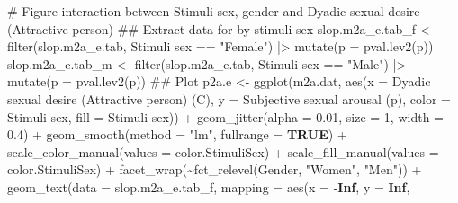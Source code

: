 \documentclass[
  bookmarksnumbered]{article}
\newenvironment{Shaded}{\begin{snugshade}}{\end{snugshade}}
\newcommand{\AttributeTok}[1]{\textcolor[rgb]{0.80,0.80,0.80}{#1}}
\newcommand{\CommentTok}[1]{\textcolor[rgb]{0.50,0.62,0.50}{#1}}
\newcommand{\ConstantTok}[1]{\textcolor[rgb]{0.86,0.64,0.64}{\textbf{#1}}}
\newcommand{\DecValTok}[1]{\textcolor[rgb]{0.86,0.86,0.80}{#1}}
\newcommand{\DocumentationTok}[1]{\textcolor[rgb]{0.50,0.62,0.50}{#1}}
\newcommand{\FloatTok}[1]{\textcolor[rgb]{0.75,0.75,0.82}{#1}}
\newcommand{\FunctionTok}[1]{\textcolor[rgb]{0.94,0.94,0.56}{#1}}
\newcommand{\NormalTok}[1]{\textcolor[rgb]{0.80,0.80,0.80}{#1}}
\newcommand{\OtherTok}[1]{\textcolor[rgb]{0.94,0.94,0.56}{#1}}
\newcommand{\SpecialCharTok}[1]{\textcolor[rgb]{0.86,0.64,0.64}{#1}}
\newcommand{\StringTok}[1]{\textcolor[rgb]{0.80,0.58,0.58}{#1}}
\begin{document}
\begin{Shaded}
\begin{Highlighting}[]
\CommentTok{\# Figure interaction between Stimuli sex, gender and Dyadic sexual desire (Attractive person)}
\DocumentationTok{\#\# Extract data for by stimuli sex}
\NormalTok{slop.m2a\_e.tab\_f }\OtherTok{\textless{}{-}} \FunctionTok{filter}\NormalTok{(slop.m2a\_e.tab, }\StringTok{\textasciigrave{}}\AttributeTok{Stimuli sex}\StringTok{\textasciigrave{}} \SpecialCharTok{==} \StringTok{"Female"}\NormalTok{) }\SpecialCharTok{|\textgreater{}}
  \FunctionTok{mutate}\NormalTok{(}\AttributeTok{p =} \FunctionTok{pval.lev2}\NormalTok{(p))}
\NormalTok{slop.m2a\_e.tab\_m }\OtherTok{\textless{}{-}} \FunctionTok{filter}\NormalTok{(slop.m2a\_e.tab, }\StringTok{\textasciigrave{}}\AttributeTok{Stimuli sex}\StringTok{\textasciigrave{}} \SpecialCharTok{==} \StringTok{"Male"}\NormalTok{) }\SpecialCharTok{|\textgreater{}}
  \FunctionTok{mutate}\NormalTok{(}\AttributeTok{p =} \FunctionTok{pval.lev2}\NormalTok{(p))}
\DocumentationTok{\#\# Plot}
\NormalTok{p2a.e }\OtherTok{\textless{}{-}} \FunctionTok{ggplot}\NormalTok{(m2a.dat, }\FunctionTok{aes}\NormalTok{(}\AttributeTok{x =} \StringTok{\textasciigrave{}}\AttributeTok{Dyadic sexual desire (Attractive person) (C)}\StringTok{\textasciigrave{}}\NormalTok{,}
                             \AttributeTok{y =} \StringTok{\textasciigrave{}}\AttributeTok{Subjective sexual arousal (p)}\StringTok{\textasciigrave{}}\NormalTok{,}
                             \AttributeTok{color =} \StringTok{\textasciigrave{}}\AttributeTok{Stimuli sex}\StringTok{\textasciigrave{}}\NormalTok{, }\AttributeTok{fill =} \StringTok{\textasciigrave{}}\AttributeTok{Stimuli sex}\StringTok{\textasciigrave{}}\NormalTok{)) }\SpecialCharTok{+}
  \FunctionTok{geom\_jitter}\NormalTok{(}\AttributeTok{alpha =} \FloatTok{0.01}\NormalTok{, }\AttributeTok{size =} \DecValTok{1}\NormalTok{, }\AttributeTok{width =} \FloatTok{0.4}\NormalTok{) }\SpecialCharTok{+}
  \FunctionTok{geom\_smooth}\NormalTok{(}\AttributeTok{method =} \StringTok{"lm"}\NormalTok{, }\AttributeTok{fullrange =} \ConstantTok{TRUE}\NormalTok{) }\SpecialCharTok{+}
  \FunctionTok{scale\_color\_manual}\NormalTok{(}\AttributeTok{values =}\NormalTok{ color.StimuliSex) }\SpecialCharTok{+}
  \FunctionTok{scale\_fill\_manual}\NormalTok{(}\AttributeTok{values =}\NormalTok{ color.StimuliSex) }\SpecialCharTok{+}
  \FunctionTok{facet\_wrap}\NormalTok{(}\SpecialCharTok{\textasciitilde{}}\FunctionTok{fct\_relevel}\NormalTok{(Gender, }\StringTok{"Women"}\NormalTok{, }\StringTok{"Men"}\NormalTok{)) }\SpecialCharTok{+}
  \FunctionTok{geom\_text}\NormalTok{(}\AttributeTok{data =}\NormalTok{ slop.m2a\_e.tab\_f,}
            \AttributeTok{mapping =} \FunctionTok{aes}\NormalTok{(}\AttributeTok{x =} \SpecialCharTok{{-}}\ConstantTok{Inf}\NormalTok{, }\AttributeTok{y =} \ConstantTok{Inf}\NormalTok{,}

\end{Highlighting}
\end{Shaded}
\end{document}
